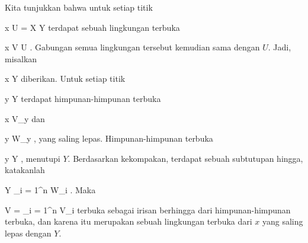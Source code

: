 Kita tunjukkan bahwa untuk setiap titik

\mavergleichskette
{\vergleichskette
{ x
}
{ \in }{ U
}
{ = }{ X \setminus Y
}
{    }{
}
{   }{
}
}
{}{}{}
terdapat sebuah lingkungan terbuka

\mavergleichskette
{\vergleichskette
{ x
}
{ \in }{ V
}
{ \subseteq }{ U
}
{    }{
}
{   }{
}
}
{}{}{}.
Gabungan semua lingkungan tersebut kemudian sama dengan $U$. Jadi, misalkan

\mavergleichskette
{\vergleichskette
{ x
}
{ \notin }{ Y
}
{  }{
}
{    }{
}
{   }{
}
}
{}{}{}
diberikan. Untuk setiap titik

\mavergleichskette
{\vergleichskette
{ y
}
{ \in }{ Y
}
{  }{
}
{    }{
}
{   }{
}
}
{}{}{}
terdapat himpunan-himpunan terbuka

\mavergleichskette
{\vergleichskette
{ x
}
{ \in }{ V_y
}
{  }{
}
{    }{
}
{   }{
}
}
{}{}{}
dan

\mavergleichskette
{\vergleichskette
{ y
}
{ \in }{ W_y
}
{  }{
}
{    }{
}
{   }{
}
}
{}{}{,}
yang saling lepas. Himpunan-himpunan terbuka

 {}
 {y \in Y} {}
 {} {} {} {,}
menutupi $Y$. Berdasarkan kekompakan, terdapat sebuah subtutupan hingga, katakanlah

\mavergleichskettedisp
{\vergleichskette
{ Y
}
{ \subseteq} { \bigcup_{i = 1}^n  W_i
}
{ } {
}
{ } {
}
{ } {
}
}
{}{}{.}
Maka

\mavergleichskette
{\vergleichskette
{ V
}
{ = }{ \bigcap_{i = 1}^n  V_i
}
{  }{
}
{    }{
}
{   }{
}
}
{}{}{}
terbuka sebagai irisan berhingga dari himpunan-himpunan terbuka, dan karena itu merupakan sebuah lingkungan terbuka dari $x$ yang saling lepas dengan $Y$.
